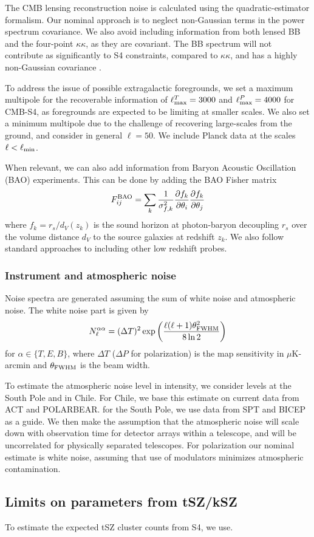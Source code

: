 The CMB lensing reconstruction noise is calculated using the \cite{Hu:2002} quadratic-estimator formalism. Our nominal approach is to neglect non-Gaussian terms in the power spectrum covariance. We also avoid including information from both lensed BB and the four-point $\kappa \kappa$, as they are covariant. The BB spectrum will not contribute as significantly to S4 constraints, compared to $\kappa \kappa$, and has a highly non-Gaussian covariance \cite{Benoit-Levy:2012}. 

To address the issue of possible extragalactic foregrounds, we set a maximum multipole for the recoverable information of $\ell^T_{\rm max} = 3000$ and $\ell^P_{\rm max} = 4000$ for CMB-S4, as foregrounds are expected to be limiting at smaller scales. We also set a minimum multipole due to the challenge of recovering large-scales from the ground, and consider in general $\ell=50$. We include Planck data at the scales $\ell<\ell_{\rm min}$. 

When relevant, we can also add information from Baryon Acoustic Oscillation (BAO) experiments. This can be done by adding the BAO Fisher matrix
%
\begin{equation}
F_{ij}^{\rm BAO} = \sum_{k} \frac{1}{\sigma_{f,k}^2}\frac{\partial f_k}{\partial \theta_i}\frac{\partial f_k}{\partial \theta_j}
\end{equation}
%
where $f_k = r_s/d_V(z_k)$ is the sound horizon at photon-baryon decoupling $r_s$ over the volume distance $d_V$ to the source galaxies at redshift $z_k$. We also follow standard approaches to including other low redshift probes.

\subsubsection{Instrument and atmospheric noise}
Noise spectra are generated assuming the sum of white noise and atmospheric noise. The white noise part is given by
%
\begin{equation}
N^{\alpha \alpha}_\ell = (\Delta T)^2 \exp \left( \frac{\ell(\ell + 1) \theta^2_{\rm FWHM}}{8 \ln 2} \right)
\end{equation}
%
for $\alpha \in \{T, E, B\}$, where $\Delta T$ ($\Delta P$ for polarization) is the map sensitivity in $\mu$K-arcmin and $\theta_{\rm FWHM}$ is the beam width. 

To estimate the atmospheric noise level in intensity, we consider levels at the South Pole and in Chile. For Chile, we base this estimate on current data from ACT and POLARBEAR. for the South Pole, we use data from SPT and BICEP as a guide. We then make the assumption that the atmospheric noise will scale down with observation time for detector arrays within a telescope, and will be uncorrelated for physically separated telescopes. For polarization our nominal estimate is white noise, assuming that use of modulators minimizes atmospheric contamination.

%

\subsection{Limits on parameters from tSZ/kSZ}

To estimate the expected tSZ cluster counts from S4, we use.

